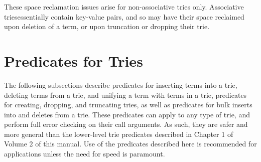 
These space reclamation issues arise for non-associative tries only.
Associative triesessentially contain key-value pairs, and so may have
their space reclaimed upon deletion of a term, or upon truncation or
dropping their trie.

\section{Predicates for Tries} 
%
The following subsections describe predicates for inserting terms into
a trie, deleting terms from a trie, and unifying a term with terms in
a trie, predicates for creating, dropping, and truncating tries, as
well as predicates for bulk inserts into and deletes from a trie.
These predicates can apply to any type of trie, and perform full error
checking on their call arguments.  As such, they are safer and more
general than the lower-level trie predicates described in Chapter 1 of
Volume 2 of this manual.  Use of the predicates described here is
recommended for applications unless the need for speed is paramount.

